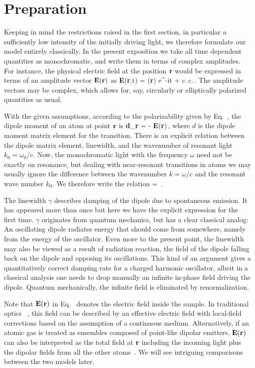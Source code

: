 \section{Preparation}
Keeping in mind the restrictions raised in the first section, in particular a sufficiently low intensity of the initially driving light, we therefore formulate our model entirely classically. In the present exposition we take all time dependent quantities as monochromatic, and write them in terms of complex amplitudes. For instance, the physical electric field at the position ${\bf r}$ would be expressed in terms of an amplitude vector ${\bf E}({\bf r})$ as
\beq
{\bf E}({\bf r},t) = ({\bf r}) e^{-i\omega t} + {\rm c.\,c.}\,.
\eeq
The amplitude vectors may be complex, which allows for, say, circularly or elliptically polarized quantities as usual. 

With the given assumptions, according to the polarizability given by Eq.~, the dipole moment of an atom at point $\bf r$ is
\beq
{\bf d}_{{\bf r}} = - {\bf E}({\bf r})\,,
\label{staticEtoD}
\eeq
where $d$ is the dipole moment matrix element for the transition. There is an explicit relation between the dipole matrix element, linewidth, and the wavenumber of resonant light $k_0 = \omega_0/c$. Now, the monochromatic light with the frequency $\omega$ need not be exactly on resonance, but dealing with near-resonant transitions in atoms we may usually ignore the difference between the wavenumber $k=\omega/c$ and the resonant wave number $k_0$. We therefore write the relation
\beq
\gamma = \,.
\eeq

The linewidth $\gamma$ describes damping of the dipole due to spontaneous emission. It has appeared more than once but here we have the explicit expression for the first time. $\gamma$ originates from quantum mechanics, but has a clear classical analog: An oscillating dipole radiates energy that should come from somewhere, namely from the energy of the oscillator. Even more to the present point, the linewidth may also be viewed as a result of radiation reaction, the field of the dipole falling back on the dipole and opposing its oscillations. This kind of an argument gives a quantitatively correct damping rate for a charged harmonic oscillator, albeit in a classical analysis one needs to drop manually an infinite in-phase field driving the dipole. Quantum mechanically, the infinite field is eliminated by renormalization.

Note that $\bf{E}(\bf{r})$ in Eq.~ denotes the electric field inside the sample. In traditional optics ~\cite{jackson,optics}, this field can be described by an effective electric field with local-field corrections based on the assumption of a continuous medium. Alternatively, if an atomic gas is treated as ensembles composed of point-like dipolar emitters, $\bf{E}(\bf{r})$ can also be interpreted as the total field at $\bf{r}$ including the incoming light plus the dipolar fields from all the other atoms~\cite{PhysRevLett.112.113603}. We will see intriguing comparisons between the two models later. 

